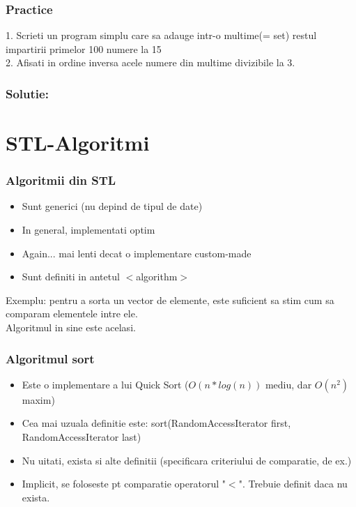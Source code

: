 \documentclass{beamer}
\begin{document}
  \begin{frame}
  \frametitle{Practice}
  1. Scrieti un program simplu care sa adauge intr-o multime(= set) restul impartirii primelor 100 numere la 15
  \\2. Afisati in ordine inversa acele numere din multime divizibile la 3.
  \end{frame}

  \begin{frame}
  \frametitle{Solutie:}
  
  \end{frame}

\section{STL-Algoritmi}

  \frame{\tableofcontents[currentsection]}

  \begin{frame}
  \frametitle{Algoritmii din STL}
  \begin{itemize}
  \pause \item Sunt generici (nu depind de tipul de date)
  \pause \item In general, implementati optim
  \pause \item Again... mai lenti decat o implementare custom-made
  \pause \item Sunt definiti in antetul $<$algorithm$>$
  \end{itemize}
  Exemplu: pentru a sorta un vector de elemente, este suficient sa stim cum sa comparam elementele intre ele. \\Algoritmul in sine este acelasi.
  \end{frame}

  \begin{frame}
  \frametitle{Algoritmul sort}
  \begin{itemize}
  \pause \item Este o implementare a lui Quick Sort ($O(n*log(n))$ mediu, dar $O(n^2)$ maxim)
  \pause \item Cea mai uzuala definitie este: sort(RandomAccessIterator first, RandomAccessIterator last)
  \pause \item Nu uitati, exista si alte definitii (specificara criteriului de comparatie, de ex.)
  \pause \item Implicit, se foloseste pt comparatie operatorul "$<$". Trebuie definit daca nu exista.
  \end{itemize}
  \end{frame}
\end{document}
